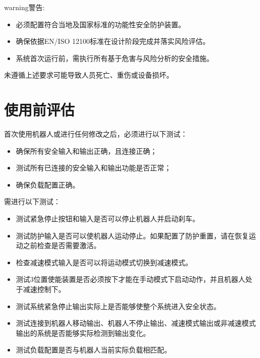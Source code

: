 \documentclass[a4paper,11pt,english,openany,oneside]{sphinxmanual}
\begin{document}
\begin{sphinxadmonition}{warning}{警告:}
\sphinxAtStartPar
{}
\begin{itemize}
\item {} 
\sphinxAtStartPar
必须配置符合当地及国家标准的功能性安全防护装置。

\item {} 
\sphinxAtStartPar
确保依据EN/ISO 12100标准在设计阶段完成并落实风险评估。

\item {} 
\sphinxAtStartPar
系统首次运行前，需执行所有基于危害与风险分析的安全措施。

\end{itemize}

\sphinxAtStartPar
未遵循上述要求可能导致人员死亡、重伤或设备损坏。
\end{sphinxadmonition}


\section{使用前评估}
\label{\detokenize{05 _u5b89_u5168_u89c4_u8303:id9}}
\sphinxAtStartPar
首次使用机器人或进行任何修改之后，必须进行以下测试：
\begin{itemize}
\item {} 
\sphinxAtStartPar
确保所有安全输入和输出正确，且连接正确；

\item {} 
\sphinxAtStartPar
测试所有已连接的安全输入和输出功能是否正常；

\item {} 
\sphinxAtStartPar
确保负载配置正确。

\end{itemize}

\sphinxAtStartPar
需进行以下测试：
\begin{itemize}
\item {} 
\sphinxAtStartPar
测试紧急停止按钮和输入是否可以停止机器人并启动刹车。

\item {} 
\sphinxAtStartPar
测试防护输入是否可以使机器人运动停止。如果配置了防护重置，请在恢复运动之前检查是否需要激活。

\item {} 
\sphinxAtStartPar
检查减速模式输入是否可以将运动模式切换到减速模式。

\item {} 
\sphinxAtStartPar
测试3位置使能装置是否必须按下才能在手动模式下启动动作，并且机器人处于减速控制下。

\item {} 
\sphinxAtStartPar
测试系统紧急停止输出实际上是否能够使整个系统进入安全状态。

\item {} 
\sphinxAtStartPar
测试连接到机器人移动输出、机器人不停止输出、减速模式输出或非减速模式输出的系统是否能够实际检测到输出变化。

\item {} 
\sphinxAtStartPar
测试负载配置是否与机器人当前实际负载相匹配。

\end{itemize}
\end{document}
